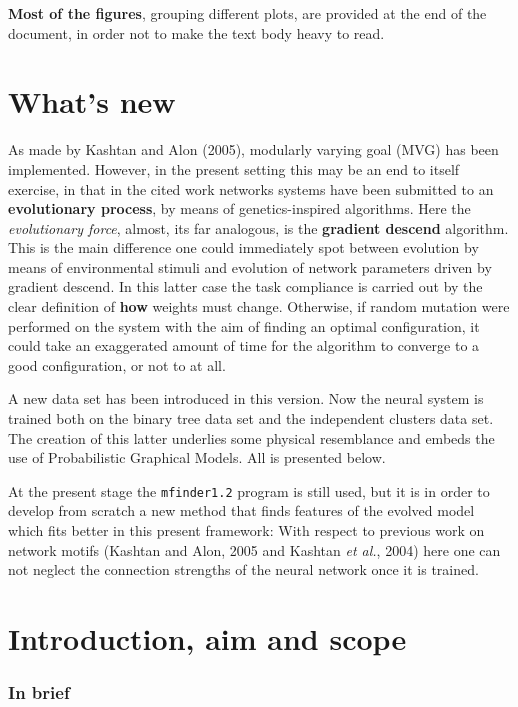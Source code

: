 \documentclass[a4paper,12pt]{article}
\begin{document}
\noindent \textbf{Most of the figures}, grouping different plots, are provided at the end of the document, in order not to make the text body heavy to read.

\newpage

\section*{What's new}

As made by Kashtan and Alon (2005), modularly varying goal (MVG) has been implemented. However, in the present setting this may be an end to itself exercise, in that in the cited work networks systems have been submitted to an \textbf{evolutionary process}, by means of genetics-inspired algorithms. Here the \textit{evolutionary force}, almost, its far analogous, is the \textbf{gradient descend} algorithm. This is the main difference one could immediately spot between evolution by means of environmental stimuli and evolution of network parameters driven by gradient descend. In this latter case the task compliance is carried out by the clear definition of \textbf{how} weights must change. Otherwise, if random mutation were performed on the system with the aim of finding an optimal configuration, it could take an exaggerated amount of time for the algorithm to converge to a good configuration, or not to at all.

A new data set has been introduced in this version. Now the neural system is trained both on the binary tree data set and the independent clusters data set. The creation of this latter underlies some physical resemblance and embeds the use of Probabilistic Graphical Models. All is presented below. 

At the present stage the \texttt{mfinder1.2} program is still used, but it is in order to develop from scratch a new method that finds features of the evolved model which fits better in this present framework: With respect to previous work on network motifs (Kashtan and Alon, 2005 and Kashtan \textit{et al.}, 2004) here one can not neglect the connection strengths of the neural network once it is trained. 

\section{Introduction, aim and scope}

\subsubsection*{In brief}
\end{document}
